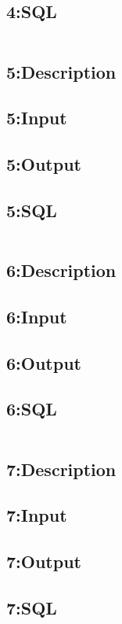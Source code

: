 \documentclass[a4paper, 10pt]{article}
\begin{document}
\subsection{4:SQL}
\begin{lstlisting}[language=SQL]
\end{lstlisting}

\subsection{5:Description}

\subsection{5:Input}

\subsection{5:Output}

\subsection{5:SQL}
\begin{lstlisting}[language=SQL]
\end{lstlisting}

\subsection{6:Description}

\subsection{6:Input}

\subsection{6:Output}

\subsection{6:SQL}
\begin{lstlisting}[language=SQL]
\end{lstlisting}

\subsection{7:Description}

\subsection{7:Input}

\subsection{7:Output}

\subsection{7:SQL}
\begin{lstlisting}[language=SQL]
\end{lstlisting}
\end{document}
